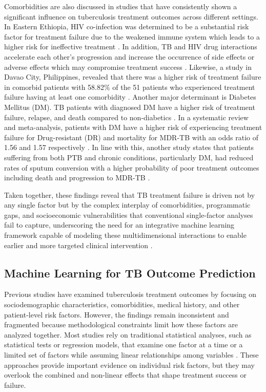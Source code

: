 \documentclass[12pt]{article}
\begin{document}
Comorbidities are also discussed in studies that have consistently shown a significant influence on tuberculosis treatment outcomes across different settings. In Eastern Ethiopia, HIV co-infection was determined to be a substantial risk factor for treatment failure due to the weakened immune system which leads to a higher risk for ineffective treatment \citep{ref2}. In addition, TB and HIV drug interactions accelerate each other's progression and increase the occurrence of side effects or adverse effects which may compromise treatment success \citep{ref3}. Likewise, a study in Davao City, Philippines, revealed that there was a higher risk of treatment failure in comorbid patients with 58.82\% of the 51 patients who experienced treatment failure having at least one comorbidity \citep{ref9}. Another major determinant is Diabetes Mellitus (DM). TB patients with diagnosed DM have a higher risk of treatment failure, relapse, and death compared to non-diabetics \citep{ref14}. In a systematic review and meta-analysis, patients with DM have a higher risk of experiencing treatment failure for Drug-resistant (DR) and mortality for MDR-TB with an odds ratio of 1.56 and 1.57 respectively \citep{ref22}. In line with this, another study states that patients suffering from both PTB and chronic conditions, particularly DM, had reduced rates of sputum conversion with a higher probability of poor treatment outcomes including death and progression to MDR-TB \citep{ref17}.

Taken together, these findings reveal that TB treatment failure is driven not by any single factor but by the complex interplay of comorbidities, programmatic gaps, and socioeconomic vulnerabilities that conventional single-factor analyses fail to capture, underscoring the need for an integrative machine learning framework capable of modeling these multidimensional interactions to enable earlier and more targeted clinical intervention \citep{ref2, ref9, ref14, ref15, ref16, ref22, ref25, ref28, ref30}.

\subsection{Machine Learning for TB Outcome Prediction}

Previous studies have examined tuberculosis treatment outcomes by focusing on sociodemographic characteristics, comorbidities, medical history, and other patient-level risk factors. However, the findings remain inconsistent and fragmented because methodological constraints limit how these factors are analyzed together. Most studies rely on traditional statistical analyses, such as statistical tests or regression models, that examine one factor at a time or a limited set of factors while assuming linear relationships among variables \citep{ref2}. These approaches provide important evidence on individual risk factors, but they may overlook the combined and non-linear effects that shape treatment success or failure.
\end{document}
